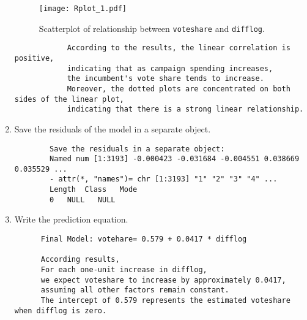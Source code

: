\documentclass[12pt,letterpaper]{article}
\begin{document}
\begin{enumerate}
\begin{figure}[h!]
			\caption{\footnotesize Scatterplot of relationship between \texttt{voteshare}  and  \texttt{difflog}.}
			\label{fig:Rplot_1}
			\texttt{[image: Rplot\_1.pdf]}
		\end{figure}
	\begin{footnotesize}
		\begin{verbatim}
			According to the results, the linear correlation is positive, 
			indicating that as campaign spending increases, 
			the incumbent's vote share tends to increase.
			Moreover, the dotted plots are concentrated on both sides of the linear plot, 
			indicating that there is a strong linear relationship.
			\end{verbatim}
	\end{footnotesize}
		\vspace{80.15cm}
		\item Save the residuals of the model in a separate object.
		
		\vspace{.15cm}
		 
		\vspace{.15cm}
	\begin{footnotesize}
		\begin{verbatim} 
		Save the residuals in a separate object:
		Named num [1:3193] -0.000423 -0.031684 -0.004551 0.038669 0.035529 ...
		- attr(*, "names")= chr [1:3193] "1" "2" "3" "4" ...
		Length  Class   Mode 
		0   NULL   NULL 
		\end{verbatim}
	\end{footnotesize}
		\item Write the prediction equation.
		
		\vspace{.15cm}
		 
		\vspace{.15cm}
		\vspace{.15cm}
	\begin{footnotesize}
		\begin{verbatim}
	  Final Model: votehare= 0.579 + 0.0417 * difflog
	  
	  According results,
	  For each one-unit increase in difflog, 
	  we expect voteshare to increase by approximately 0.0417, 
	  assuming all other factors remain constant. 
	  The intercept of 0.579 represents the estimated voteshare when difflog is zero.
			\end{verbatim}
	\end{footnotesize}
	\end{enumerate}
	
\end{document}
